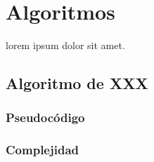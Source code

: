 

\section{Algoritmos}\label{algorithms}
lorem ipsum dolor sit amet.

\subsection{Algoritmo de XXX}

\subsubsection{Pseudocódigo}
\subsubsection{Complejidad}
